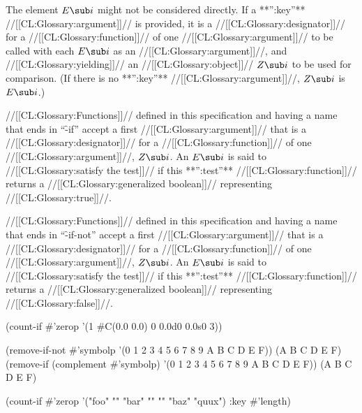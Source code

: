 The element $E\sub i$ might not be considered directly.
If a **'':key''** //[[CL:Glossary:argument]]// is provided,
it is a //[[CL:Glossary:designator]]// for a //[[CL:Glossary:function]]// of one //[[CL:Glossary:argument]]// 
to be called with each $E\sub i$ as an //[[CL:Glossary:argument]]//, 
and //[[CL:Glossary:yielding]]// an //[[CL:Glossary:object]]// $Z\sub i$ to be used for comparison.
(If there is no **'':key''** //[[CL:Glossary:argument]]//, $Z\sub i$ is $E\sub i$.)

//[[CL:Glossary:Functions]]// defined in this specification and having a name that
ends in ``\f{-if}'' accept a first //[[CL:Glossary:argument]]// that is a //[[CL:Glossary:designator]]// for a 
//[[CL:Glossary:function]]// of one //[[CL:Glossary:argument]]//, $Z\sub i$.
An $E\sub i$ is said to //[[CL:Glossary:satisfy the test]]// if this **'':test''** //[[CL:Glossary:function]]//
returns a //[[CL:Glossary:generalized boolean]]// representing //[[CL:Glossary:true]]//.

//[[CL:Glossary:Functions]]// defined in this specification and having a name that
ends in ``\f{-if-not}'' accept a first //[[CL:Glossary:argument]]// that is a //[[CL:Glossary:designator]]// for a 
//[[CL:Glossary:function]]// of one //[[CL:Glossary:argument]]//, $Z\sub i$.
An $E\sub i$ is said to //[[CL:Glossary:satisfy the test]]// if this **'':test''** //[[CL:Glossary:function]]//
returns a //[[CL:Glossary:generalized boolean]]// representing //[[CL:Glossary:false]]//.


\code
 (count-if #'zerop '(1 #C(0.0 0.0) 0 0.0d0 0.0s0 3)) 

 (remove-if-not #'symbolp '(0 1 2 3 4 5 6 7 8 9 A B C D E F))
\EV (A B C D E F)
 (remove-if (complement #'symbolp) '(0 1 2 3 4 5 6 7 8 9 A B C D E F))
\EV (A B C D E F)

 (count-if #'zerop '("foo" "" "bar" "" "" "baz" "quux") :key #'length)
\endcode

\endsubsubsection%

\endsubsection%
